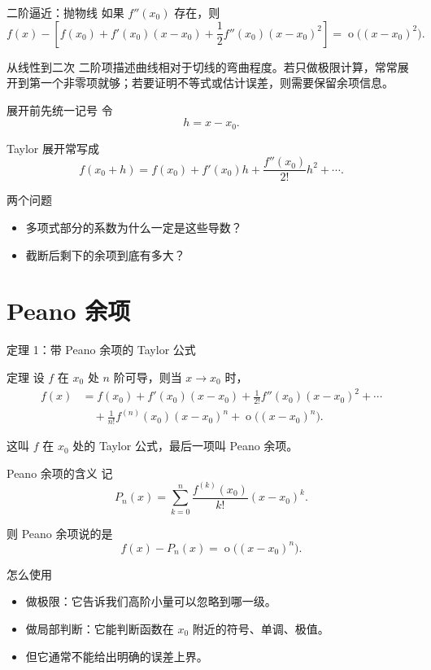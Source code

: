 \documentclass[aspectratio=169,11pt]{ctexbeamer}
\newcommand{\ord}{\operatorname{o}}
\begin{document}
\begin{frame}{二阶逼近：抛物线}
\small
如果 $f''(x_0)$ 存在，则
\[
  f(x)-\left[
  f(x_0)+f'(x_0)(x-x_0)
  +\frac12 f''(x_0)(x-x_0)^2
  \right]
  =
  \ord\bigl((x-x_0)^2\bigr).
\]

\begin{block}{从线性到二次}
二阶项描述曲线相对于切线的弯曲程度。若只做极限计算，常常展开到第一个非零项就够；若要证明不等式或估计误差，则需要保留余项信息。
\end{block}
\end{frame}

\begin{frame}{展开前先统一记号}
\small
令
\[
  h=x-x_0.
\]

Taylor 展开常写成
\[
  f(x_0+h)
  =
  f(x_0)+f'(x_0)h+\frac{f''(x_0)}{2!}h^2+\cdots.
\]

\begin{block}{两个问题}
\begin{itemize}
  \item 多项式部分的系数为什么一定是这些导数？
  \item 截断后剩下的余项到底有多大？
\end{itemize}
\end{block}
\end{frame}

\section{Peano 余项}

\begin{frame}{定理 1：带 Peano 余项的 Taylor 公式}
\small
\begin{block}{定理}
设 $f$ 在 $x_0$ 处 $n$ 阶可导，则当 $x\to x_0$ 时，
\[
\begin{aligned}
f(x)
&= f(x_0)+f'(x_0)(x-x_0)
  +\frac{1}{2!}f''(x_0)(x-x_0)^2+\cdots  \\
&\quad
  +\frac{1}{n!}f^{(n)}(x_0)(x-x_0)^n
  +\ord\bigl((x-x_0)^n\bigr).
\end{aligned}
\]
\end{block}

这叫 $f$ 在 $x_0$ 处的 Taylor 公式，最后一项叫 Peano 余项。
\end{frame}

\begin{frame}{Peano 余项的含义}
\small
记
\[
  P_n(x)=\sum_{k=0}^n
  \frac{f^{(k)}(x_0)}{k!}(x-x_0)^k.
\]

则 Peano 余项说的是
\[
  f(x)-P_n(x)=\ord\bigl((x-x_0)^n\bigr).
\]

\begin{block}{怎么使用}
\begin{itemize}
  \item 做极限：它告诉我们高阶小量可以忽略到哪一级。
  \item 做局部判断：它能判断函数在 $x_0$ 附近的符号、单调、极值。
  \item 但它通常不能给出明确的误差上界。
\end{itemize}
\end{block}
\end{frame}
\end{document}
